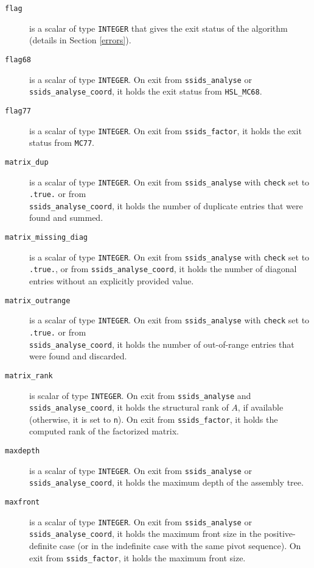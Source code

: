 \documentclass{spral}
\begin{document}
\begin{description}

\item[\texttt{flag}] is a scalar of type  {\tt INTEGER}
that gives the exit status of the algorithm (details in Section \ref{errors}).

\item[\texttt{flag68}] is a scalar of type  {\tt INTEGER}.
On exit from {\tt ssids\_analyse} or {\tt ssids\_analyse\_coord}, it holds
the exit status from {\tt HSL\_MC68}.


\item[\texttt{flag77}] is a scalar of type  {\tt INTEGER}.
On exit from {\tt ssids\_factor}, it holds
the exit status from {\tt MC77}.

\item[\texttt{matrix\_dup}] is a scalar  of type  {\tt INTEGER}.
On exit from {\tt ssids\_analyse}
with {\tt check} set to {\tt .true.} or from \\
{\tt ssids\_analyse\_coord}, it holds the
number of duplicate entries that were found and summed.

\item[\texttt{matrix\_missing\_diag}] is a scalar of type {\tt INTEGER}.
On exit from {\tt ssids\_analyse} with {\tt check} set to {\tt .true.},
or from {\tt ssids\_analyse\_coord}, it holds the number of diagonal
entries without an explicitly provided value.

\item[\texttt{matrix\_outrange}] is a scalar  of type  {\tt INTEGER}.
On exit from {\tt ssids\_analyse}
with {\tt check} set to {\tt .true.} or from \\
{\tt ssids\_analyse\_coord}, it holds the
number of out-of-range entries that were   found and discarded.

\item[\texttt{matrix\_rank}] is scalar of type  {\tt INTEGER}. On exit from
{\tt ssids\_analyse} and {\tt ssids\_analyse\_coord}, it holds
the structural rank of $A$, if available (otherwise, it is set to {\tt n}).
On exit from
{\tt ssids\_factor}, it holds the computed rank of
the factorized matrix.

\item[\texttt{maxdepth}] is a scalar of type  {\tt INTEGER}. On exit from
{\tt ssids\_analyse}  or {\tt ssids\_analyse\_coord}, it holds the maximum depth of the assembly tree.

\item[\texttt{maxfront}] is a scalar of type  {\tt INTEGER}. On exit from
{\tt ssids\_analyse}  or {\tt ssids\_analyse\_coord}, it holds the maximum front size
in the positive-definite case (or in the indefinite case with
the same pivot sequence). On exit from
{\tt ssids\_factor}, it holds the maximum front size.


\end{description}
\end{document}
